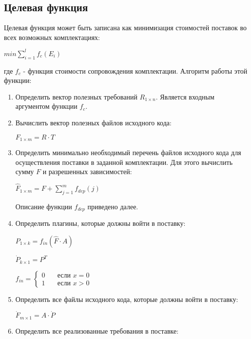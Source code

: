 \subsection*{Целевая функция}
Целевая функция может быть записана как минимизация стоимостей поставок во всех возможных комплектациях:
\begin{center}
  $\displaystyle min \sum^{l}_{i = 1} f_{c}(E_{i})$
\end{center}

где $f_{c}$ - функция стоимости сопровождения комплектации. Алгоритм работы этой функции:

\begin{enumerate}
  \item Определить вектор полезных требований $R_{1 \times n}$. Является входным аргументом функции $f_{c}$.
  \item Вычислить вектор полезных файлов исходного кода:
  \begin{center}
    $F_{1 \times m} = R \cdot T$
  \end{center}
  \item Определить минимально необходимый перечень файлов исходного кода для осуществления поставки в заданной комплектации. Для этого вычислить сумму $F$ и разрешенных зависимостей: 
  \begin{center}
    $\displaystyle \hat{F}_{1 \times m} = F + \sum^{m}_{j = 1}f_{dep}(j)$
  \end{center}
  Описание функции $f_{dep}$ приведено далее.
  \item Определить плагины, которые должны войти в поставку:
  \begin{center}
    $P_{1 \times k} = f_{in}(\hat{F} \cdot A)$
  \end{center}
  \begin{center}
    $\dot{P}_{k \times 1} = P^{T}$
  \end{center}
  \begin{center}
    $
    f_{in} =
    \begin{cases}
      0 & \quad \text{если } x = 0 \\
      1 & \quad \text{если } x > 0
    \end{cases}
    $
  \end{center}
  \item Определить все файлы исходного кода, которые должны войти в поставку:
  \begin{center}
    $\dot{F}_{m \times 1} = A \cdot \dot{P}$
  \end{center}
  \item Определить все реализованные требования в поставке:

\end{enumerate}
